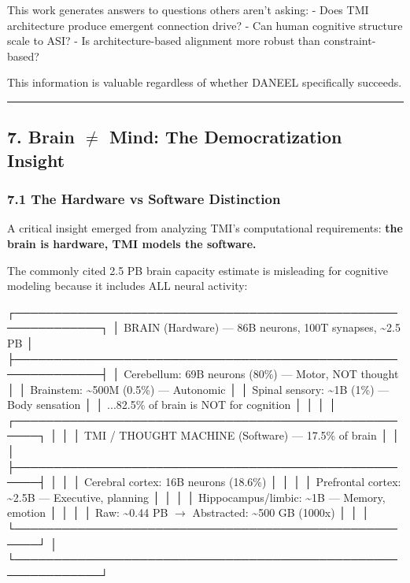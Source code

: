 \documentclass[
]{article}
\newenvironment{Shaded}{}{}
\newcommand{\NormalTok}[1]{#1}
\begin{document}
This work generates answers to questions others aren't asking: - Does
TMI architecture produce emergent connection drive? - Can human
cognitive structure scale to ASI? - Is architecture-based alignment more
robust than constraint-based?

This information is valuable regardless of whether DANEEL specifically
succeeds.

\begin{center}\rule{0.5\linewidth}{0.5pt}\end{center}

\hypertarget{brain-mind-the-democratization-insight}{%
\subsection{7. Brain $\neq$ Mind: The Democratization
Insight}\label{brain-mind-the-democratization-insight}}

\hypertarget{the-hardware-vs-software-distinction}{%
\subsubsection{7.1 The Hardware vs Software
Distinction}\label{the-hardware-vs-software-distinction}}

A critical insight emerged from analyzing TMI's computational
requirements: \textbf{the brain is hardware, TMI models the software.}

The commonly cited 2.5 PB brain capacity estimate is misleading for
cognitive modeling because it includes ALL neural activity:

\begin{Shaded}
\begin{Highlighting}[]
\NormalTok{┌─────────────────────────────────────────────────────────────┐}
\NormalTok{│ BRAIN (Hardware) — 86B neurons, 100T synapses, \textasciitilde{}2.5 PB      │}
\NormalTok{├─────────────────────────────────────────────────────────────┤}
\NormalTok{│  Cerebellum:     69B neurons (80\%)  — Motor, NOT thought    │}
\NormalTok{│  Brainstem:     \textasciitilde{}500M (0.5\%)        — Autonomic             │}
\NormalTok{│  Spinal sensory: \textasciitilde{}1B (1\%)           — Body sensation        │}
\NormalTok{│  ...82.5\% of brain is NOT for cognition                     │}
\NormalTok{│                                                             │}
\NormalTok{│  ┌─────────────────────────────────────────────────────┐    │}
\NormalTok{│  │ TMI / THOUGHT MACHINE (Software) — 17.5\% of brain   │    │}
\NormalTok{│  ├─────────────────────────────────────────────────────┤    │}
\NormalTok{│  │  Cerebral cortex:    16B neurons (18.6\%)            │    │}
\NormalTok{│  │  Prefrontal cortex: \textasciitilde{}2.5B — Executive, planning     │    │}
\NormalTok{│  │  Hippocampus/limbic: \textasciitilde{}1B — Memory, emotion          │    │}
\NormalTok{│  │  Raw: \textasciitilde{}0.44 PB $\rightarrow$ Abstracted: \textasciitilde{}500 GB (1000x)        │    │}
\NormalTok{│  └─────────────────────────────────────────────────────┘    │}
\NormalTok{└─────────────────────────────────────────────────────────────┘}
\end{Highlighting}
\end{Shaded}
\end{document}
